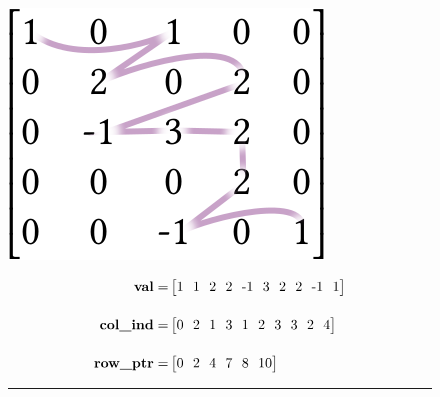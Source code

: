 \begin{figure}[p]
\hfill
\begin{minipage}[b]{0.3\linewidth}
\includegraphics[width=0.95\linewidth]{figures/csrorder.png}
\end{minipage}
\hfill
\begin{minipage}[b]{0.5\linewidth}
\begin{align*}
\text{\bf val} =& \begin{bmatrix}
1\ \ 1\ \ 2\ \ 2\ \ \text{-}1\ \ 3\ \ 2\ \ 2\ \ \text{-}1\ \ 1\\
\end{bmatrix}\\[4mm]
\text{\bf col\_ind} =& \begin{bmatrix}
0\ \ 2\ \ 1\ \ 3\ \ 1\ \ 2\ \ 3\ \ 3\ \ 2\ \ 4\\
\end{bmatrix}\\[4mm]
\text{\bf row\_ptr} =& \begin{bmatrix}
0\ \ 2\ \ 4\ \ 7\ \ 8\ \ 10\\
\end{bmatrix}
\end{align*}
\end{minipage}
\hfill

\vspace{0.8em}
\hrule
\vspace{0.3em}


\end{figure}
